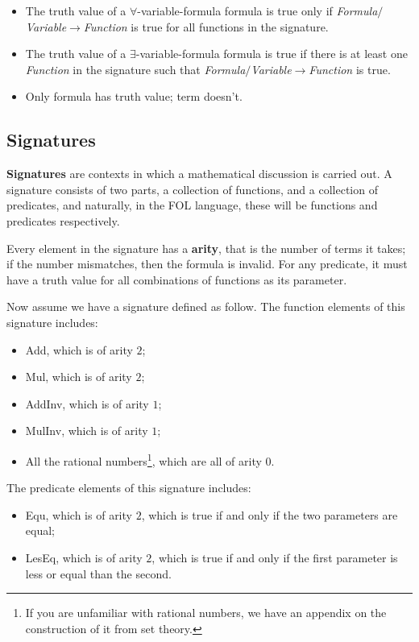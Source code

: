 \documentclass[../main.tex]{subfiles}
\begin{document}
\begin{itemize}
\begin{center}
\begin{table}[!htbp]
\end{table}
\end{center}
\vspace{-1cm}
    \item The truth value of a $\forall$-variable-formula formula is true only if \textit{Formula}$/$\textit{Variable}$\to$\textit{Function} is true for all functions in the signature.
    \item The truth value of a $\exists$-variable-formula formula is true if there is at least one \textit{Function} in the signature such that \textit{Formula}$/$\textit{Variable}$\to$\textit{Function} is true.
    \item Only formula has truth value; term doesn't.
\end{itemize}

\subsection{Signatures}
\textbf{Signatures} are contexts in which a mathematical discussion is carried out. A signature consists of two parts, a collection of functions, and a collection of predicates, and naturally, in the FOL language, these will be functions and predicates respectively.

Every element in the signature has a \textbf{arity}, that is the number of terms it takes; if the number mismatches, then the formula is invalid. For any predicate, it must have a truth value for all combinations of functions as its parameter.

Now assume we have a signature defined as follow. The function elements of this signature includes:
\begin{itemize}
    \item Add, which is of arity $2$;
    \item Mul, which is of arity $2$;
    \item AddInv, which is of arity $1$;
    \item MulInv, which is of arity $1$;
    \item All the rational numbers\footnote{If you are unfamiliar with rational numbers, we have an appendix on the construction of it from set theory.}, which are all of arity $0$.
\end{itemize}
The predicate elements of this signature includes:
\begin{itemize}
    \item Equ, which is of arity $2$, which is true if and only if the two parameters are equal;
    \item LesEq, which is of arity $2$, which is true if and only if the first parameter is less or equal than the second.
\end{itemize}
\end{document}
